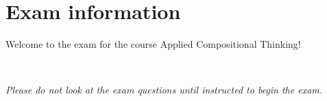 \documentclass[paper=8.125in:10.250in,pagesize=pdftex,
    headinclude=false,footinclude=false,oneside,egregdoesnotlikesansseriftitles]{kaobook}
\begin{document}
%
%
%
%
%
%
%
%
%
%
%
%
%
%


\section*{Exam information}


Welcome to the exam for the course Applied Compositional Thinking! 

\

\emph{Please do not look at the exam questions until instructed to begin the exam.}

\
\end{document}
